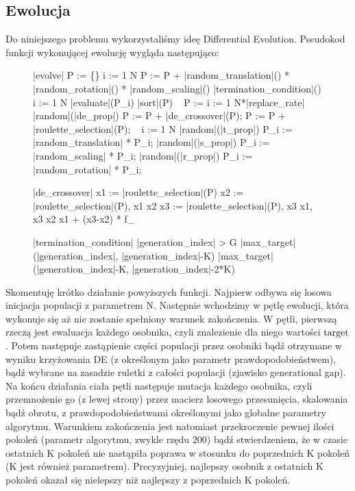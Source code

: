 \documentclass[a4paper,12pt,leqno]{article}
\begin{document}
\subsection{Ewolucja}
Do niniejszego problemu wykorzystaliśmy ideę Differential Evolution. Pseudokod funkcji wykonującej ewolucję wygląda następująco:
\begin{figure}
\begin{program}
\FUNCT |evolve| \BODY
    P := \{\}
    \FOR i := 1 \TO N \DO
        P := P + |random_translation|() * |random_rotation|() * |random_scaling|()
    \END
    \WHILE \NOT |termination_condition|() \DO
        \FOR i := 1 \TO N \DO
            |evaluate|(P_i)
        \END
        |sort|(P) 
        ~
        P := 
        \FOR i := 1 \TO N*|replace_rate| \DO
            \IF |random|(|de_prop|)
                \THEN P := P + |de_crossover|(P);
                \ELSE P := P + |roulette_selection|(P); \FI
        \END
        ~
        \FOR i := 1 \TO N \DO 
            \IF |random|(|t_prop|)
	        \THEN P_i := |random_translation| * P_i; \FI
            \IF |random|(|s_prop|)
                \THEN P_i := |random_scaling| * P_i; \FI
            \IF |random|(|r_prop|)
                \THEN P_i := |random_rotation| * P_i; \FI
        \END
    \END
\END

\FUNCT |de_crossover| \BODY
    x1 := |roulette_selection|(P)
    x2 := |roulette_selection|(P),\; x1 \neq x2
    x3 := |roulette_selection|(P),\; x3 \neq x1,\; x3 \geq x2
    \RETURN x1 + (x3-x2) * f_
\END

\FUNCT |termination_condition| \BODY
    \RETURN |generation_index| > G \vee
            |max_target|(|generation_index|, |generation_index|-K) \geq
            |max_target|(|generation_index|-K, |generation_index|-2*K)
\END
\end{program}
\end{figure}

Skomentuję krótko działanie powyższych funkcji. Najpierw odbywa się losowa inicjacja populacji z parametrem N. Następnie wchodzimy w pętlę ewolucji,
która wykonuje się aż nie zostanie spełniony warunek zakończenia.
W pętli, pierwszą rzeczą jest ewaluacja każdego osobnika, czyli znalezienie dla niego wartości $\mathrm{target}$. 
Potem następuje zastąpienie części populacji przez osobniki bądź otrzymane w wyniku krzyżowania DE (z określonym jako parametr prawdopodobieństwem),
bądź wybrane na zasadzie ruletki z całości populacji (zjawisko generational gap).
Na końcu działania ciała pętli następuje mutacja każdego osobnika, czyli przemnożenie go (z lewej strony) przez macierz losowego przesunięcia, 
skalowania bądź obrotu, z prawdopodobieństwami określonymi jako globalne parametry algorytmu.
Warunkiem zakończenia jest natomiast przekroczenie pewnej ilości pokoleń (parametr algorytmu, zwykle rzędu 200) bądź stwierdzeniem, 
że w czasie ostatnich K pokoleń nie nastąpiła poprawa w stosunku do poprzednich K pokoleń (K jest również parametrem). Precyzyjniej, najlepszy osobnik z ostatnich 
K pokoleń okazał się nielepszy niż najlepszy z poprzednich K pokoleń.
\end{document}
